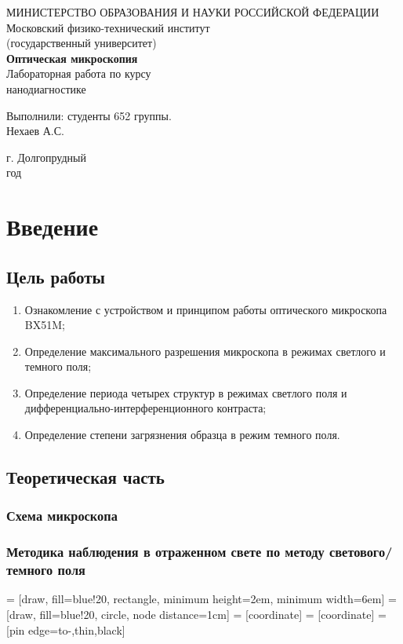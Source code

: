 \documentclass[a4paper, 12pt]{article}
\begin{document}
	\begin{titlepage}
		\begin{center}
		МИНИСТЕРСТВО ОБРАЗОВАНИЯ И НАУКИ РОССИЙСКОЙ ФЕДЕРАЦИИ\\
		\footnotesize{Московский физико-технический институт}\\
		\footnotesize{(государственный университет)}\\
		\vfill
		{\LARGE
		\textbf{Оптическая микроскопия}\\
		}
		\vspace{1cm}
		Лабораторная работа по курсу\\
		нанодиагностике
		\vfill
		\begin{flushright}
			Выполнили: студенты 652 группы.\\
            Нехаев А.С.\\
		\end{flushright}
		\vfill
		г. Долгопрудный\\
		\the\year\:год
		\end{center}
	\end{titlepage}
	\newpage
	\tableofcontents
    \newpage
	\section{Введение}
	\subsection{Цель работы}
	\begin{enumerate}
		\item Ознакомление с устройством и принципом работы оптического микроскопа BX51M;
		\item Определение максимального разрешения микроскопа в режимах светлого и темного поля;
		\item Определение периода четырех структур в режимах светлого поля и дифференциально-интерференционного контраста;
		\item Определение степени загрязнения образца в режим темного поля.
	\end{enumerate}
	\subsection{Теоретическая часть}
	\subsubsection{Схема микроскопа}
	\subsubsection{Методика наблюдения в отраженном свете по методу светового/темного поля}
	 = [draw, fill=blue!20, rectangle, minimum height=2em, minimum width=6em]
	 = [draw, fill=blue!20, circle, node distance=1cm]
	 = [coordinate]
	 = [coordinate]
	 = [pin edge={to-,thin,black}]
\end{document}

